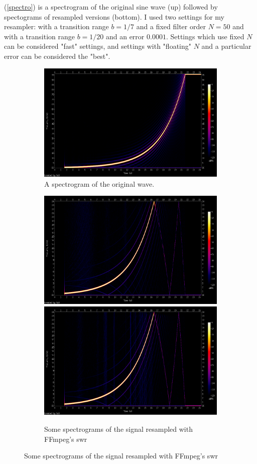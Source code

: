 \documentclass[a4paper,11pt,fleqn]{article}
\let\oldref\ref
\renewcommand{\ref}[1]{(\oldref{#1})}
\begin{document}
\ref{spectro} is a spectrogram of the original sine wave (up) followed by spectograms of resampled versions (bottom). I used two settings for my resampler: with a transition range $b=1/7$ and a fixed filter order $N=50$
and with a transition range $b=1/20$ and an error $0.0001$. Settings which use fixed $N$ can be considered "fast" settings, and settings with "floating" $N$ and a particular error can be considered the "best".
\begin{figure}[h!]
  \begin{subfigure}{\linewidth}
  \includegraphics[width=\linewidth]{original.png}\hfill
  \caption{A spectrogram of the original wave.}
  \end{subfigure}\par\medskip
  \begin{subfigure}{\linewidth}
  \includegraphics[width=.4\linewidth]{swr50.png}\hfill
  \includegraphics[width=.4\linewidth]{swr200.png}\hfill
  \caption{Some spectrograms of the signal resampled with FFmpeg's swr}
  \end{subfigure}\par\medskip

\end{figure}
\end{document}
